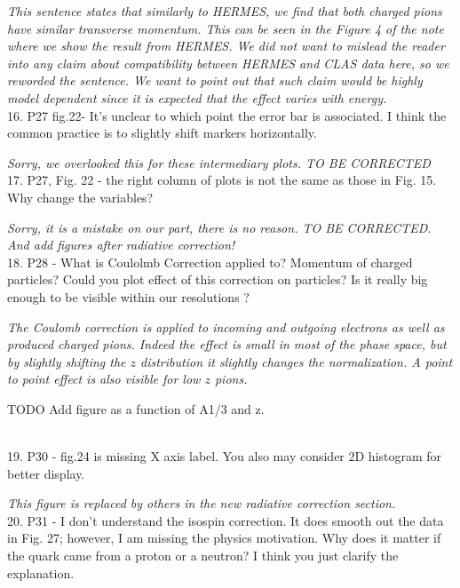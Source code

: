 \documentclass[12pt]{article}
\begin{document}
{\it This sentence states that similarly to HERMES, we find that both charged pions have similar
transverse momentum. This can be seen in the Figure 4 of the note where we show the result from 
HERMES. We did not want to mislead the reader into any claim about compatibility between 
HERMES and CLAS data here, so we reworded the sentence. We want to point out that such claim 
would be highly model dependent since it is expected that the effect varies with energy. } \\


16.
P27 fig.22-
 It's unclear to which point the error bar is associated. I think the common 
practice is to slightly shift markers horizontally.

{\it Sorry, we overlooked this for these intermediary plots. TO BE CORRECTED} \\

17.
P27, Fig. 22 - the right column of plots is not the same as those in Fig. 15.  Why change the 
variables?

{\it Sorry, it is a mistake on our part, there is no reason. TO BE CORRECTED. And
add figures after radiative correction!} \\



18.
P28 - What is Coulolmb Correction applied to? Momentum of charged particles? Could you 
plot effect of this correction on particles? Is it really big enough to be visible within our 
resolutions ?

{\it The Coulomb correction is applied to incoming and outgoing electrons as well as
produced charged pions. Indeed the effect is small in most of the phase space, but 
by slightly shifting the $z$ distribution it slightly changes the normalization. A
point to point effect is also visible for low $z$ pions. 

TODO Add figure as a function of A1/3 and z.} \\


19.
P30 - 
fig.24 is missing X axis label. You also may consider 2D histogram for better display.

{\it This figure is replaced by others in the new radiative correction section.} \\


20.
P31 - I don’t understand the isospin correction.  It does smooth out the data in Fig. 27; 
however, I am missing the physics motivation.  Why does it matter if the quark came from a 
proton or a neutron?  I think you just clarify the explanation.
\end{document}
